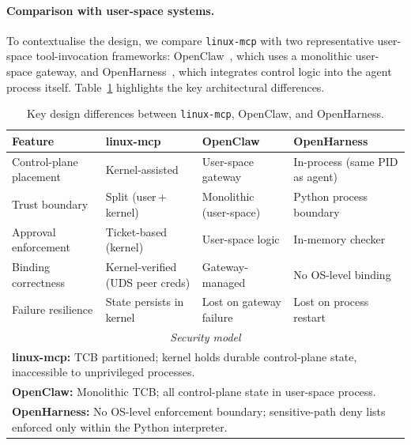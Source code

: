 \paragraph{Comparison with user-space systems.}
To contextualise the design, we compare \texttt{linux-mcp} with two representative user-space tool-invocation frameworks: OpenClaw~\cite{openclaw2026}, which uses a monolithic user-space gateway, and OpenHarness~\cite{openharness2026}, which integrates control logic into the agent process itself.
Table~\ref{tab:comparison} highlights the key architectural differences.

\begin{table}[t]
\centering
\small
\setlength{\tabcolsep}{6pt}
\begin{tabularx}{\textwidth}{l X X X}
\toprule
\textbf{Feature} & \textbf{linux-mcp} & \textbf{OpenClaw} & \textbf{OpenHarness} \\
\midrule

Control-plane placement
& Kernel-assisted
& User-space gateway
& In-process (same PID as agent) \\[4pt]

Trust boundary
& Split (user\,+\,kernel)
& Monolithic (user-space)
& Python process boundary \\[4pt]

Approval enforcement
& Ticket-based (kernel)
& User-space logic
& In-memory checker \\[4pt]

Binding correctness
& Kernel-verified (UDS peer creds)
& Gateway-managed
& No OS-level binding \\[4pt]

Failure resilience
& State persists in kernel
& Lost on gateway failure
& Lost on process restart \\[6pt]

\midrule
\multicolumn{4}{c}{\textit{Security model}} \\
\midrule

\multicolumn{4}{p{\dimexpr\textwidth-2\tabcolsep\relax}}{\textbf{linux-mcp:} TCB partitioned; kernel holds durable control-plane state, inaccessible to unprivileged processes.} \\[4pt]

\multicolumn{4}{p{\dimexpr\textwidth-2\tabcolsep\relax}}{\textbf{OpenClaw:} Monolithic TCB; all control-plane state in user-space process.} \\[4pt]

\multicolumn{4}{p{\dimexpr\textwidth-2\tabcolsep\relax}}{\textbf{OpenHarness:} No OS-level enforcement boundary; sensitive-path deny lists enforced only within the Python interpreter.} \\

\bottomrule
\end{tabularx}
\caption{Key design differences between \texttt{linux-mcp}, OpenClaw, and OpenHarness.}
\label{tab:comparison}
\end{table}

